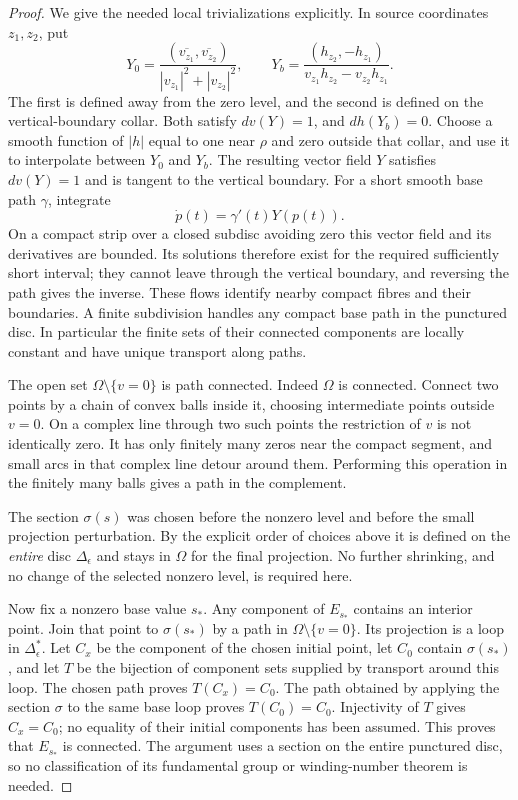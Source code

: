 \documentclass[11pt,a4paper]{article}
\theoremstyle{remark}
\begin{document}
\begin{proof}
We give the needed local trivializations explicitly.  In source
coordinates $z_1,z_2$, put
\[
 Y_0=\frac{(\overline{v_{z_1}},\overline{v_{z_2}})}
 {|v_{z_1}|^2+|v_{z_2}|^2},\qquad
 Y_b=\frac{(h_{z_2},-h_{z_1})}
 {v_{z_1}h_{z_2}-v_{z_2}h_{z_1}}.
\]
The first is defined away from the zero level, and the second is
defined on the vertical-boundary collar.  Both satisfy $dv(Y)=1$,
and $dh(Y_b)=0$.  Choose a smooth function of $|h|$ equal to one near
$\rho$ and zero outside that collar, and use it to interpolate between
$Y_0$ and $Y_b$.  The resulting vector field $Y$ satisfies $dv(Y)=1$
and is tangent to the vertical boundary.  For a short smooth base path
$\gamma$, integrate
\[
 \dot p(t)=\gamma'(t)Y(p(t)).
\]
On a compact strip over a closed subdisc avoiding zero this vector field
and its derivatives are bounded.  Its solutions therefore exist for
the required sufficiently short interval; they cannot leave through the
vertical boundary, and reversing the path gives the inverse.  These
flows identify nearby compact fibres and their boundaries.  A finite
subdivision handles any compact base path in the punctured disc.
In particular the finite sets of their connected components are locally
constant and have unique transport along paths.

The open set $\Omega\setminus\{v=0\}$ is path connected.  Indeed
$\Omega$ is connected.  Connect two points by a chain of convex balls
inside it, choosing intermediate points outside $v=0$.  On a complex
line through two such points the restriction of $v$ is not identically
zero.  It has only finitely many zeros near the compact segment, and
small arcs in that complex line detour around them.  Performing this
operation in the finitely many balls gives a path in the complement.

The section $\sigma(s)$ was chosen before the nonzero level and before
the small projection perturbation.  By the explicit order of choices
above it is defined on the \emph{entire} disc $\Delta_\epsilon$ and
stays in $\Omega$ for the final projection.  No further shrinking,
and no change of the selected nonzero level, is required here.

Now fix a nonzero base value $s_*$.  Any component of $E_{s_*}$ contains
an interior point.  Join that point to $\sigma(s_*)$ by a path in
$\Omega\setminus\{v=0\}$.  Its projection is a loop in
$\Delta_\epsilon^*$.  Let $C_x$ be the component of the chosen initial
point, let $C_0$ contain $\sigma(s_*)$, and let $T$ be the bijection of
component sets supplied by transport around this loop.  The chosen
path proves $T(C_x)=C_0$.  The path obtained by applying the section
$\sigma$ to the same base loop proves $T(C_0)=C_0$.  Injectivity of
$T$ gives $C_x=C_0$; no equality of their initial components has been
assumed.  This proves that $E_{s_*}$ is
connected.  The argument uses a section on the entire punctured disc,
so no classification of its fundamental group or winding-number theorem
is needed.


\end{proof}
\end{document}
